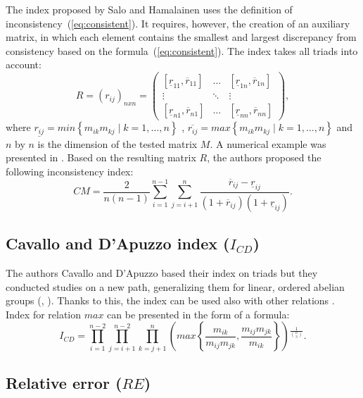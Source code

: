 The index proposed by Salo and Hamalainen \cite{SALO1995} uses the definition of inconsistency~(\ref{eq:consistent}). It requires, however, the creation of an auxiliary matrix, in which each element contains the smallest and largest discrepancy from consistency based on the formula~(\ref{eq:consistent}). The index takes all triads into account:
	\begin{equation} 
		R=(r_{ij})_{nxn}=\left(\begin{array}{ccc}
			[\underline{r}_{11},\overline{r}_{11}] & \ldots & [\underline{r}_{1n},\overline{r}_{1n}]\\
			\vdots & \ddots & \vdots\\{}
			[\underline{r}_{n1},\overline{r}_{n1}] & \ldots & [\underline{r}_{nn},\overline{r}_{nn}]
		\end{array}\right),
	\end{equation}
 where $\underline{r_{ij}}=min\left\{ m_{ik}m_{kj}\mid k=1,\ldots,n\right\}$ , $\overline{r_{ij}}=max\left\{ m_{ik}m_{kj}\mid k=1,\ldots,n\right\}$ and $n$ by $n$ is the dimension of the tested matrix $M$. A numerical example was presented in \cite{Brunelli2015}. Based on the resulting matrix $R$, the authors proposed the following inconsistency index:
 	\begin{equation} 
		\textit{CM}=\frac{2}{n(n-1)}\sum_{i=1}^{n-1}\sum_{j=i+1}^{n}\frac{\overline{r}_{ij}-\underline{r}_{ij}}{\left(1+\overline{r}_{ij}\right)\left(1+\underline{r}_{ij}\right)}.
	 \end{equation}
 

\subsection{Cavallo and D’Apuzzo index ($I_{CD}$)}

The authors Cavallo and D'Apuzzo based their index on triads but they conducted studies on a new path, generalizing them for linear, ordered abelian groups (\cite{Cavallo2009}, \cite{Cavallo2010}). Thanks to this, the index can be used also with other relations \cite{Brunelli2013}. Index for relation $max$ can be presented in the form of a formula:
	\begin{equation} 
		\label{eq:CavDAp}
		I_{CD}=\prod_{i=1}^{n-2}\prod_{j=i+1}^{n-2}\prod_{k=j+1}^{n}\left(max\left\{ \frac{m_{ik}}{m_{ij}m_{jk}},\frac{m_{ij}m_{jk}}{m_{ik}}\right\} \right){}^{\frac{1}{\binom{n}{3}}}.
	 \end{equation}
 

\subsection{Relative error ($\textit{RE}$)}

